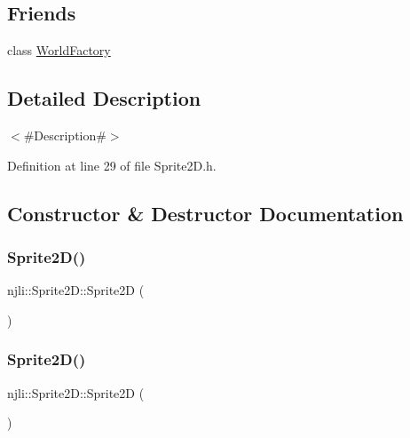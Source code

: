 \subsection*{Friends}
\begin{DoxyCompactItemize}
\item 
class \mbox{\hyperlink{classnjli_1_1_sprite2_d_acb96ebb09abe8f2a37a915a842babfac}{World\+Factory}}
\end{DoxyCompactItemize}


\subsection{Detailed Description}
$<$\#\+Description\#$>$ 

Definition at line 29 of file Sprite2\+D.\+h.



\subsection{Constructor \& Destructor Documentation}
\mbox{\label{classnjli_1_1_sprite2_d_ae1afa39b1a31b063b987d75cb2cebb9b}} 
\subsubsection{\texorpdfstring{Sprite2\+D()}{Sprite2D()}\hspace{0.1cm}{\footnotesize\ttfamily [1/3]}}
{\footnotesize\ttfamily njli\+::\+Sprite2\+D\+::\+Sprite2D (\begin{DoxyParamCaption}{ }\end{DoxyParamCaption})\hspace{0.3cm}{\ttfamily [protected]}}

\mbox{\label{classnjli_1_1_sprite2_d_a0f243b6919f6ce210a53dbf5429b1609}} 
\subsubsection{\texorpdfstring{Sprite2\+D()}{Sprite2D()}\hspace{0.1cm}{\footnotesize\ttfamily [2/3]}}
{\footnotesize\ttfamily njli\+::\+Sprite2\+D\+::\+Sprite2D (\begin{DoxyParamCaption}\item[{const \mbox{\hyperlink{classnjli_1_1_abstract_builder}{Abstract\+Builder}} \&}]{ }\end{DoxyParamCaption})\hspace{0.3cm}{\ttfamily [protected]}}

